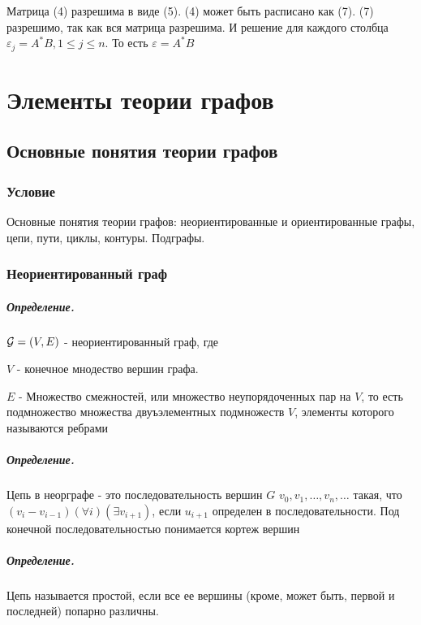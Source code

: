 \documentclass{report}
\begin{document}
\medskip

Матрица (4) разрешима в виде (5). (4) может быть расписано как (7). (7) разрешимо, так как
вся матрица разрешима. И решение для каждого столбца $\varepsilon_{j} = A^{*}B, 1\le j\le n$. То есть
$\varepsilon = A^{*}B$ 

\newpage

\chapter{Элементы теории графов}
\section{Основные понятия теории графов}
\subsection{Условие}
Основные понятия теории графов: неориентированные и ориентированные графы,
цепи, пути, циклы, контуры. Подграфы.

\subsection{Неориентированный граф}
\paragraph*{Определение.}
$ {\cal G} = (V, E)$ - неориентированный граф, где

$V$ - конечное мнодество вершин графа.

 $E$ - Множество смежностей, или множество неупорядоченных пар на  $V$, то есть подмножество
 множества  двуъэлементных подмножеств $V$, элементы которого называются ребрами

 \paragraph*{Определение.}
 Цепь в неорграфе - это последовательность вершин  $G$  $v_0, v_1,\ldots,v_n,\ldots$ такая, что
 $(v_i-v_{i-1})(\forall i)(\exists v_{i+1})$, если $u_{i+1}$ определен в последовательности.
 Под конечной последовательностью понимается
 кортеж вершин

\paragraph*{Определение.}
 Цепь называется простой, если все ее вершины (кроме, может быть, первой и последней) попарно различны.
\end{document}
